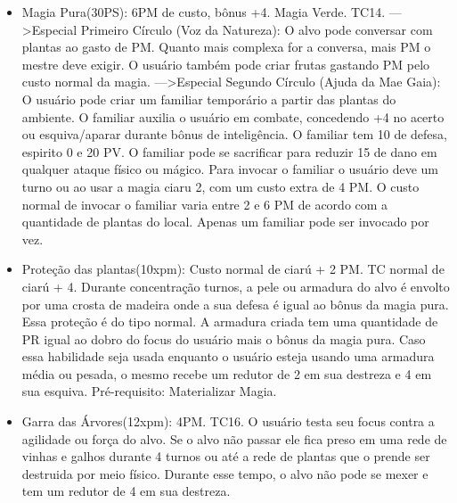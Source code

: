 \begin{itemize}
	\item Magia Pura(30PS): 6PM de custo, bônus +4. Magia Verde. TC14.\newline
--->Especial Primeiro Círculo (Voz da Natureza): O alvo pode conversar com plantas ao gasto de PM. Quanto mais complexa for a conversa, mais PM o mestre deve exigir. O usuário também pode criar frutas gastando PM pelo custo normal da  magia.
--->Especial Segundo Círculo (Ajuda da Mae Gaia): O usuário pode criar um familiar temporário a partir das plantas do ambiente. O familiar auxilia o usuário em combate, concedendo +4 no acerto ou esquiva/aparar durante bônus de inteligência. O familiar tem 10 de defesa, espirito 0 e 20 PV. O familiar pode se sacrificar para reduzir 15 de dano em qualquer ataque físico ou mágico. Para invocar o familiar o usuário deve um turno ou ao usar a magia ciaru 2, com um custo extra de 4 PM. O custo normal de invocar o familiar varia entre 2 e 6 PM de acordo com a quantidade de plantas do local. Apenas um familiar pode ser invocado por vez.
 	
\item Proteção das plantas(10xpm): Custo normal de ciarú + 2 PM. TC normal de ciarú + 4.\newline
Durante concentração turnos, a pele ou armadura do alvo é envolto por uma crosta de madeira onde a sua defesa é igual ao bônus da magia pura. Essa proteção é do tipo normal. A armadura criada tem uma quantidade de PR igual ao dobro do focus do usuário mais o bônus da magia pura. Caso essa habilidade seja usada enquanto o usuário esteja usando uma armadura média ou pesada, o mesmo recebe um redutor de 2 em sua destreza e 4 em sua esquiva. Pré-requisito: Materializar Magia.

	\item Garra das Árvores(12xpm): 4PM. TC16.\newline
O usuário testa seu focus contra a agilidade ou força do alvo. Se o alvo não passar ele fica preso em uma rede de vinhas e galhos durante 4 turnos ou até a rede de plantas que o prende ser destruida por meio físico. Durante esse tempo, o alvo não pode se mexer e tem um redutor de 4 em sua destreza.


\end{itemize}

